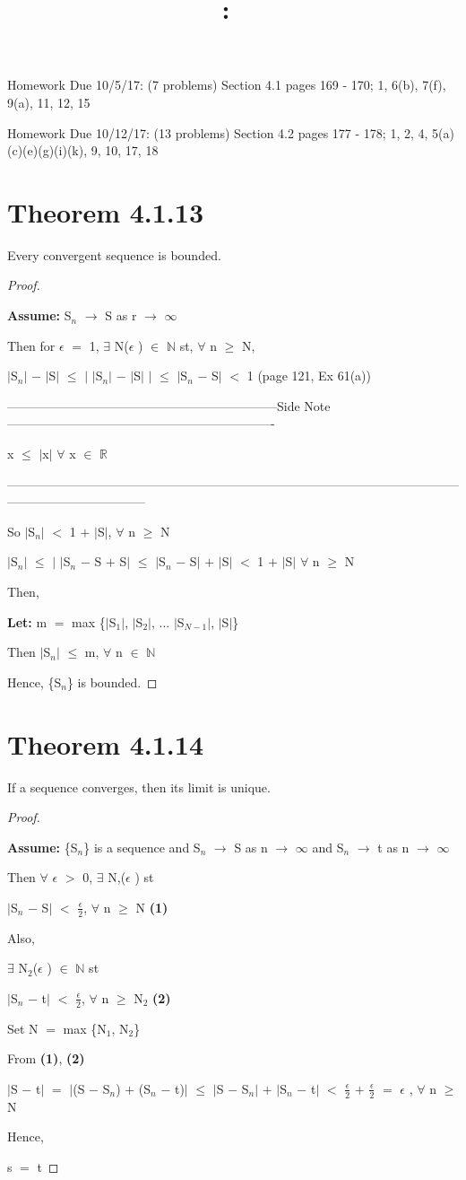 \documentclass{article}
\title{
    \vspace{2in}
    \textmd{\textbf{\hmwkClass:\ \hmwkTitle}}\\
    \normalsize\vspace{0.1in}\small\vspace{0.1in}\large{\textit{\hmwkClassInstructor}}
    \vspace{3in}
}
\author{\hmwkAuthorName}
\date{}
\newcommand{\mt}[1]{\ensuremath{#1}}
\newcommand\bsc[2][\DefaultOpt]{%
  \def\DefaultOpt{#2}%
  \section[#1]{#2}%
}
\newcommand{\bgpf}{\begin{proof} $ $\newline}
\newcommand{\lt}[1]{\textbf{Let: } #1}
\newcommand{\as}[1]{\textbf{Assume: } #1}
\newcommand{\bpth}[1]{\textbf{(#1)}}
\newcommand{\epf}{\end{proof}}
\newcommand{\sidenote}[1]{-----------------------------------------------------------------Side Note----------------------------------------------------------------
#1 \

---------------------------------------------------------------------------------------------------------------------------------------------}
\newcommand{\br}{\mt{\mathbb{R}} }       %
\newcommand{\bn}{\mt{\mathbb{N}} }       %
\newcommand{\ep}{\mt{\epsilon} }         %
\newcommand{\fa}{\mt{\forall} }          %
\newcommand{\mem}{\mt{\in} }
\newcommand{\exs}{\mt{\exists} }
\newcommand{\lra}{ \mt{\longrightarrow} } %
\newcommand{\eql}{\mt{=} }
\newcommand{\uw}[2]{#1\mt{_{#2}}}
\newcommand{\frc}[2]{\mt{\frac{#1}{#2}}}
\begin{document}
Homework Due 10/5/17: (7 problems) Section 4.1 pages 169 - 170; 1, 6(b), 7(f), 9(a), 11, 12, 15

Homework Due 10/12/17: (13 problems) Section 4.2 pages 177 - 178; 1, 2, 4, 5(a)(c)(e)(g)(i)(k), 9, 10, 17, 18

\bsc{Theorem 4.1.13}{

Every convergent sequence is bounded.

\bgpf

\as{\uw{S}{n} \lra S as r \lra $\infty$}

Then for \ep \eql 1, \exs N(\ep) \mem \bn st, \fa n $\geq$ N,

$|$\uw{S}{n}$|$ $-$ $|$S$|$ $\leq$ $|$ $|$\uw{S}{n}$|$ $-$ $|$S$|$ $|$ $\leq$ $|$\uw{S}{n} $-$ S$|$ $<$ 1  (page 121, Ex 61(a))

\sidenote{
x $\leq$ $|$x$|$ \fa x \mem \br
}

So $|$\uw{S}{n}$|$ $<$ 1 $+$ $|$S$|$, \fa n $\geq$ N

$|$\uw{S}{n}$|$ $\leq$ $|$ $|$\uw{S}{n} $-$ S $+$ S$|$ $\leq$ $|$\uw{S}{n} $-$ S$|$ $+$ $|$S$|$ $<$ 1 $+$ $|$S$|$ \fa n $\geq$ N

Then,

\lt{m \eql max \{$|$\uw{S}{1}$|$, $|$\uw{S}{2}$|$, ... $|$\uw{S}{N - 1}$|$, $|$S$|$}\}

Then $|$\uw{S}{n}$|$ $\leq$ m, \fa n \mem \bn

Hence, \{\uw{S}{n}\} is bounded.

\epf

}

\bsc{Theorem 4.1.14}{

If a sequence converges, then its limit is unique.

\bgpf

\as{\{\uw{S}{n}\} is a sequence and \uw{S}{n} \lra S as n \lra $\infty$ and \uw{S}{n} \lra t as n \lra $\infty$}

Then \fa \ep $>$ 0, \exs N,(\ep) st

$|$\uw{S}{n} $-$ S$|$ $<$ \frc{\epsilon}{2}, \fa n $\geq$ N \bpth{1}

Also,

\exs \uw{N}{2}(\ep) \mem \bn st

$|$\uw{S}{n} $-$ t$|$ $<$ \frc{\ep}{2}, \fa n $\geq$ \uw{N}{2} \bpth{2}

Set N \eql max \{\uw{N}{1}, \uw{N}{2}\}

From \bpth{1}, \bpth{2}

$|$S $-$ t$|$ \eql $|$(S $-$ \uw{S}{n}) $+$ (\uw{S}{n} $-$ t)$|$ $\leq$ $|$S $-$ \uw{S}{n}$|$ $+$ $|$\uw{S}{n} $-$ t$|$ $<$ \frc{\epsilon}{2} $+$ \frc{\epsilon}{2} \eql \ep, \fa n $\geq$ N

Hence,

s \eql t

\epf

}
\end{document}
